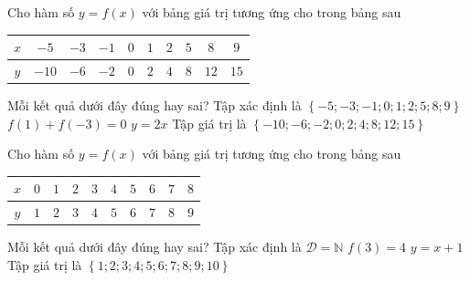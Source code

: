 
\begin{ex}%
	Cho  hàm số $y=f(x)$ với bảng giá trị tương ứng cho trong bảng sau
	\begin{center}
		\begin{tabular}{|c|c|c|c|c|c|c|c|c|c|}
			\hline 
			$x$ & $-5$ & $-3$ & $-1$ & $0$ &  $1$ & $2$ & $5$ & $8$ & $9$ \\
			 \hline
			$y$ & $-10$ & $-6$ & $-2$ & $0$ &  $2$ & $4$ & $8$ & $12$ & $15$ \\
			 \hline
		\end{tabular}
	\end{center}
	Mỗi  kết quả dưới đây đúng hay sai?
	 \choiceTF
		{\True Tập xác định  là $\left\{-5;-3;-1;0;1;2;5;8;9\right\}$}
		{$f(1)+f(-3)=0$} 
		{$y=2x$} 
		{\True Tập  giá trị là $\left\{-10;-6;-2;0;2;4;8;12;15\right\}$}
\end{ex}

\begin{ex}%
	Cho hàm số $y=f(x)$ với bảng giá trị tương  ứng cho trong bảng sau
	\begin{center}
		\begin{tabular}{|c|c|c|c|c|c|c|c|c|c|}
			 \hline
			$x$ & $0$ & $1$ & $2$ &  $3$ & $4$ & $5$ & $6$ & $7$ & $8$ \\
			\hline 
			$y$  & $1$ & $2$ & $3$ & $4$ & $5$ & $6$ & $7$ & $8$ & $9$ \\
			 \hline
		\end{tabular}
	\end{center}
	Mỗi kết quả dưới đây đúng  hay sai?
	 \choiceTF
		{Tập xác  định là $\mathscr{D}=\mathbb{N}$}
		 {\True $f(3)=4$}
		{\True  $y=x+1$}
		{Tập giá trị là $\left\{1;2;3;4;5;6;7;8;9;10\right\}$} 
\end{ex}



